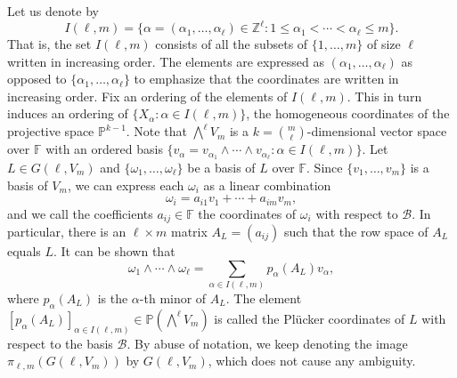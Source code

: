 \documentclass[10pt,a4paper,oneside]{amsproc}
\newcommand{\B}{\mathcal{B}}
\newcommand{\ZZ}{\mathbb{Z}}
\def\a{{\alpha}}
\def\FF{{\mathbb F}}
\def\PP{{\mathbb P}}
\begin{document}
 Let us denote by 
$$I(\ell, m) = \{\a = (\a_1, \dots, \a_\ell) \in \ZZ^\ell : 1 \le \a_1 < \cdots < \a_\ell \le m\}.$$ That is, the set $I(\ell, m)$ consists of all the subsets of $\{1, \dots, m\}$ of size $\ell$ written in increasing order. The elements are expressed as $(\a_1, \dots, \a_\ell)$ as opposed to $\{\a_1, \dots, \a_{\ell}\}$ to emphasize that the coordinates are written in increasing order.
Fix an ordering of the elements of $I(\ell, m)$. This in turn induces an ordering of $\{X_\a : \a \in I(\ell, m)\}$, the homogeneous coordinates of the projective space $\PP^{k-1}$.
Note that $\bigwedge^{\ell} V_m$ is a $k = {m \choose \ell}$-dimensional vector space over $\mathbb{F}$ with an ordered basis $\{v_\a = v_{\a_1} \wedge \cdots \wedge  v_{\a_\ell} : \a \in I(\ell, m)\}.$ Let $L \in G(\ell, V_m)$ and $\{\omega_1, \dots, \omega_\ell \}$ be a basis of $L$ over $\FF$. Since $\{v_1, \ldots, v_m\}$ is a basis of $V_m$, we can express each $\omega_i$ as a linear combination $$\omega_i = a_{i1}v_1 + \cdots + a_{im}v_m,$$ and we call the coefficients $a_{ij} \in \mathbb{F}$ the coordinates of $\omega_i$ with respect to $\mathcal{B}$.
In particular, there is an $\ell \times m$ matrix $A_L = (a_{ij})$  such that the row space of $A_L$ equals $L$. It can be shown that 
\begin{equation}\label{coord}
    \omega_1 \wedge \cdots \wedge \omega_\ell = \sum_{\a \in I(\ell, m)} p_{\a} (A_L) v_\a,
\end{equation}
where $p_{\a} (A_L)$ is the $\a$-th minor of $A_L$. The element $[p_\a (A_L)]_{\a \in I(\ell, m)} \in \PP (\bigwedge^{\ell} V_{m})$ is called the Pl\"ucker coordinates of $L$ with respect to the basis $\B$. By abuse of notation, we keep denoting the image $\pi_{\ell, m} (G(\ell, V_m))$ by $G(\ell, V_m)$, which does not cause any ambiguity.
\end{document}
